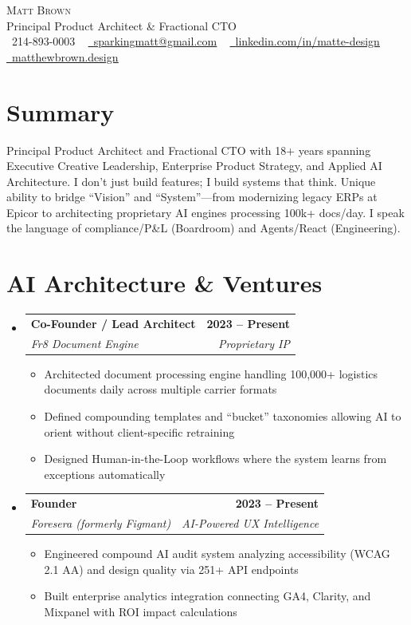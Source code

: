 \documentclass[letterpaper,11pt]{article}
\makeatletter
\newcommand{\resumeItem}[1]{
  \item\small{
    {#1 \vspace{-2pt}}
  }
}
\newcommand{\resumeSubheading}[4]{
  \vspace{-2pt}\item
    \begin{tabular*}{1.0\textwidth}[t]{l@{\extracolsep{\fill}}r}
      \textbf{#1} & \textbf{\small #2} \\
      \textit{\small#3} & \textit{\small #4} \\
    \end{tabular*}\vspace{-7pt}
}
\newcommand{\resumeSubHeadingListStart}{\begin{itemize}[leftmargin=0.0in, label={}]}
\newcommand{\resumeSubHeadingListEnd}{\end{itemize}}
\newcommand{\resumeItemListStart}{\begin{itemize}}
\newcommand{\resumeItemListEnd}{\end{itemize}\vspace{-5pt}}
\makeatother
\begin{document}
\begin{center}
    {\Huge \scshape Matt Brown} \\ \vspace{1pt}
    \small Principal Product Architect \& Fractional CTO \\ \vspace{8pt}
    \small \raisebox{-0.1\height}\faPhone\ 214-893-0003 ~
    \href{mailto:sparkingmatt@gmail.com}{\raisebox{-0.2\height}\faEnvelope\  \underline{sparkingmatt@gmail.com}} ~
    \href{https://linkedin.com/in/matte-design/}{\raisebox{-0.2\height}\faLinkedin\ \underline{linkedin.com/in/matte-design}}  ~
    \href{https://matthewbrown.design}{\raisebox{-0.2\height}\faGlobe\ \underline{matthewbrown.design}}
    \vspace{-8pt}
\end{center}

\section{Summary}
Principal Product Architect and Fractional CTO with 18+ years spanning Executive Creative Leadership, Enterprise Product Strategy, and Applied AI Architecture. I don't just build features; I build systems that think. Unique ability to bridge ``Vision'' and ``System''---from modernizing legacy ERPs at Epicor to architecting proprietary AI engines processing 100k+ docs/day. I speak the language of compliance/P\&L (Boardroom) and Agents/React (Engineering).

\section{AI Architecture \& Ventures}
    \resumeSubHeadingListStart
      \resumeSubheading
        {Co-Founder / Lead Architect}{2023 -- Present}
        {Fr8 Document Engine}{Proprietary IP}
        \resumeItemListStart
            \resumeItem{Architected document processing engine handling 100,000+ logistics documents daily across multiple carrier formats}
            \resumeItem{Defined compounding templates and ``bucket'' taxonomies allowing AI to orient without client-specific retraining}
            \resumeItem{Designed Human-in-the-Loop workflows where the system learns from exceptions automatically}
        \resumeItemListEnd

      \resumeSubheading
        {Founder}{2023 -- Present}
        {Foresera (formerly Figmant)}{AI-Powered UX Intelligence}
        \resumeItemListStart
            \resumeItem{Engineered compound AI audit system analyzing accessibility (WCAG 2.1 AA) and design quality via 251+ API endpoints}
            \resumeItem{Built enterprise analytics integration connecting GA4, Clarity, and Mixpanel with ROI impact calculations}
        \resumeItemListEnd
    \resumeSubHeadingListEnd
\end{document}
